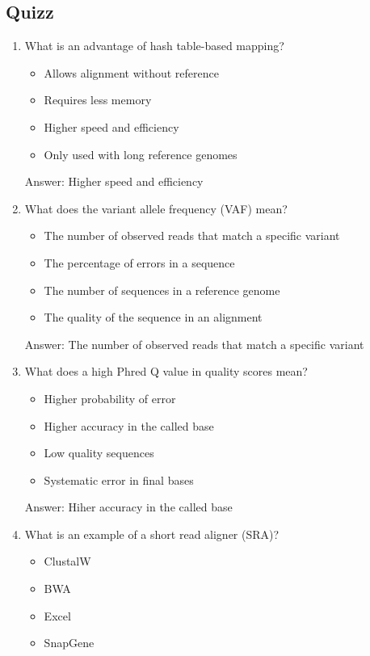 \begin{itemize}
\section{Quizz}
\begin{enumerate}
\item What is an advantage of hash table-based mapping?
\begin{itemize}
\item Allows alignment without reference
\item Requires less memory
\item Higher speed and efficiency
\item Only used with long reference genomes
\end{itemize}

Answer: Higher speed and efficiency

\item What does the variant allele frequency (VAF) mean?
\begin{itemize}
\item The number of observed reads that match a specific variant
\item The percentage of errors in a sequence
\item The number of sequences in a reference genome
\item The quality of the sequence in an alignment
\end{itemize}

Answer: The number of observed reads that match a specific variant

\item What does a high Phred Q value in quality scores mean?
\begin{itemize}
\item Higher probability of error
\item Higher accuracy in the called base
\item Low quality sequences
\item Systematic error in final bases
\end{itemize}

Answer: Hiher accuracy in the called base

\item What is an example of a short read aligner (SRA)?
\begin{itemize}
\item ClustalW
\item BWA
\item Excel
\item SnapGene
\end{itemize}


\end{enumerate}
\end{itemize}
